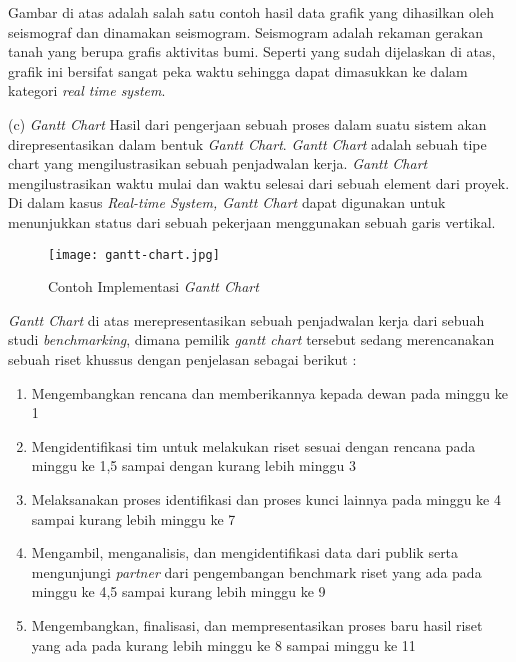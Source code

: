 \documentclass[a4paper,twoside]{article}
\begin{document}
\begin{enumerate}
		Gambar di atas adalah salah satu contoh hasil data grafik yang dihasilkan oleh seismograf dan dinamakan seismogram. Seismogram adalah rekaman gerakan tanah yang berupa grafis aktivitas bumi. Seperti yang sudah dijelaskan di atas, grafik ini bersifat sangat peka waktu sehingga dapat dimasukkan ke dalam kategori {\it real time system}.
		
		(c) {\it Gantt Chart}\newline
		Hasil dari pengerjaan sebuah proses dalam suatu sistem akan direpresentasikan dalam bentuk {\it Gantt Chart}. {\it Gantt Chart} adalah sebuah tipe chart yang mengilustrasikan sebuah penjadwalan kerja. {\it Gantt Chart} mengilustrasikan waktu mulai dan waktu selesai dari sebuah element dari proyek. Di dalam kasus {\it Real-time System, Gantt Chart} dapat digunakan untuk menunjukkan status dari sebuah pekerjaan menggunakan sebuah garis vertikal.
		\begin{center}
        \begin{figure}[!htbp]
            \centering
            \texttt{[image: gantt-chart.jpg]}
            \caption{Contoh Implementasi {\it Gantt Chart}}
            \label{}
        \end{figure}
		\end{center}
		
		{\it Gantt Chart} di atas merepresentasikan sebuah penjadwalan kerja dari sebuah studi {\it benchmarking}, dimana pemilik {\it gantt chart} tersebut sedang merencanakan sebuah riset khussus dengan penjelasan sebagai berikut : 
		\begin{enumerate}
		\item Mengembangkan rencana dan memberikannya kepada dewan pada minggu ke 1
		\item Mengidentifikasi tim untuk melakukan riset sesuai dengan rencana pada minggu ke 1,5 sampai dengan kurang lebih minggu 3
		\item Melaksanakan proses identifikasi dan proses kunci lainnya pada minggu ke 4 sampai kurang lebih minggu ke 7
		\item Mengambil, menganalisis, dan mengidentifikasi data dari publik serta mengunjungi {\it partner} dari pengembangan benchmark riset yang ada pada minggu ke 4,5 sampai kurang lebih minggu ke 9
		\item Mengembangkan, finalisasi, dan mempresentasikan proses baru hasil riset yang ada pada kurang lebih minggu ke 8 sampai minggu ke 11
		\end{enumerate}
		

\end{enumerate}
\end{document}
